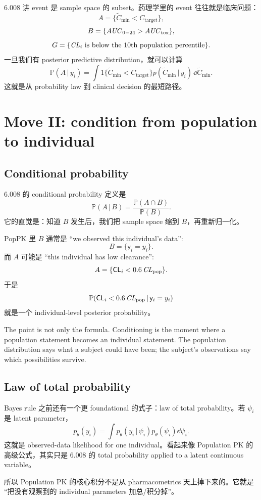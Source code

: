 \documentclass[a4paper]{article}
\newcommand{\rv}[1]{\mathsf{#1}}
\newcommand{\given}{\,|\,}
\newcommand{\Prob}{\mathbb{P}}
\newcommand{\pop}{\mathrm{pop}}
\begin{document}
6.008 讲 event 是 sample space 的 subset。药理学里的 event 往往就是临床问题：
\[
  A=\{\tilde C_{\min}<C_{\mathrm{target}}\},
\]
\[
  B=\{\pksym{AUC}_{0-24} > \pksym{AUC}_{\mathrm{tox}}\},
\]
\[
  G=\{\pksym{CL}_i \text{ is below the 10th population percentile}\}.
\]
一旦我们有 posterior predictive distribution，就可以计算
\[
  \Prob(A\given y_i)
  =
  \int 1\{\tilde C_{\min}<C_{\mathrm{target}}\}
  p(\tilde C_{\min}\given y_i)\,\dd \tilde C_{\min}.
\]
这就是从 probability law 到 clinical decision 的最短路径。

\section{Move II: condition from population to individual}

\subsection{Conditional probability}

6.008 的 conditional probability 定义是
\[
  \Prob(A\given B)=\frac{\Prob(A\cap B)}{\Prob(B)}.
\]
它的直觉是：知道 \(B\) 发生后，我们把 sample space 缩到 \(B\)，再重新归一化。

PopPK 里 \(B\) 通常是 ``we observed this individual's data'':
\[
  B=\{\rv{y}_i=y_i\}.
\]
而 \(A\) 可能是 ``this individual has low clearance'':
\[
  A=\{\rv{CL}_i < 0.6\,\pksym{CL}_{\pop}\}.
\]
于是
\[
  \Prob(\rv{CL}_i < 0.6\,\pksym{CL}_{\pop}\given \rv{y}_i=y_i)
\]
就是一个 individual-level posterior probability。

The point is not only the formula.  Conditioning is the moment where a population statement becomes an individual statement.  The population distribution says what a subject could have been; the subject's observations say which possibilities survive.

\subsection{Law of total probability}

Bayes rule 之前还有一个更 foundational 的式子：law of total probability。若 \(\psi_i\) 是 latent parameter，
\[
  p_\theta(y_i)
  =
  \int
  p_\theta(y_i\given \psi_i)
  p_\theta(\psi_i)
  \dd\psi_i.
\]
这就是 observed-data likelihood for one individual。看起来像 Population PK 的高级公式，其实只是 6.008 的 total probability applied to a latent continuous variable。

\begin{remark}
  所以 Population PK 的核心积分不是从 pharmacometrics 天上掉下来的。它就是 ``把没有观察到的 individual parameters 加总/积分掉''。
\end{remark}
\end{document}
